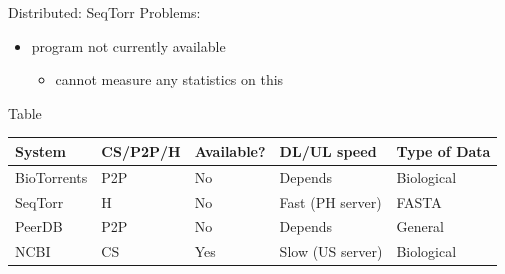 \documentclass{beamer}
\begin{document}
    
    \begin{frame}{Distributed: SeqTorr}
        Problems: %
        \begin{itemize}
            \item program not currently available
            \begin{itemize}
                \item cannot measure any statistics on this
            \end{itemize}
        \end{itemize}
    \end{frame}
    
    \begin{frame}{Table}
   \begin{table}[]
        \begin{tabular}{|l|l|l|l|l|}
        \hline
        System      & CS/P2P/H & Available? & DL/UL speed & Type of Data \\ \hline
        BioTorrents & P2P           & No         & Depends                    & Biological  \\ \hline
        SeqTorr     & H             & No         & Fast (PH server)           & FASTA        \\ \hline
        PeerDB      & P2P           & No         & Depends                    & General      \\ \hline
        NCBI        & CS            & Yes        & Slow (US server)           & Biological  \\ \hline
        \end{tabular}
    \end{table} 
\end{frame}

\end{document}
